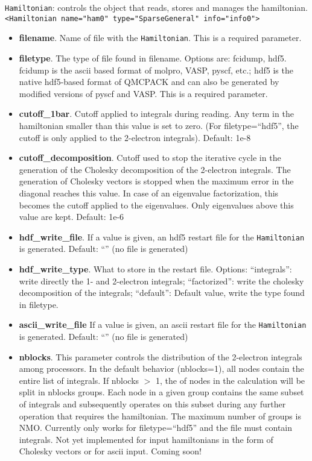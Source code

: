 \texttt{Hamiltonian}: controls the object that reads, stores and manages the hamiltonian. 
  \texttt{<Hamiltonian name="ham0" type="SparseGeneral" info="info0">}
\begin{itemize}
\item \textbf{filename}. Name of file with the \texttt{Hamiltonian}. This is a required parameter.
\item \textbf{filetype}. The type of file found in filename. Options are: fcidump, hdf5. fcidump is the ascii based format of molpro, VASP, pyscf, etc.; hdf5 is the native hdf5-based format  of QMCPACK and can also be generated by modified versions of pyscf and VASP. This is a required parameter.
\item \textbf{cutoff\_1bar}. Cutoff applied to integrals during reading. Any term in the hamiltonian smaller than this value is set to zero. (For filetype=``hdf5'', the cutoff is only applied to the 2-electron integrals). Default: 1e-8
\item \textbf{cutoff\_decomposition}. Cutoff used to stop the iterative cycle in the generation of the Cholesky decomposition of the 2-electron integrals. The generation of Cholesky vectors is stopped when the maximum error in the diagonal reaches this value. In case of an eigenvalue factorization, this becomes the cutoff applied to the eigenvalues. Only eigenvalues above this value are kept. Default: 1e-6
\item \textbf{hdf\_write\_file}. If a value is given, an hdf5 restart file for the \texttt{Hamiltonian} is generated. Default: ``'' (no file is generated)
\item \textbf{hdf\_write\_type}. What to store in the restart file. Options: ``integrals'': write directly the 1- and 2-electron integrals; ``factorized'': write the cholesky decomposition of the integrals; ``default'': Default value, write the type found in filetype.
\item \textbf{ascii\_write\_file} If a value is given, an ascii restart file for the \texttt{Hamiltonian} is generated. Default: ``'' (no file is generated)
\item \textbf{nblocks}. This parameter controls the distribution of the 2-electron integrals among processors. In the default behavior (nblocks=1), all nodes contain the entire list of integrals. If nblocks $>$ 1, the of nodes in the calculation will be split in nblocks groups. Each node in a given group contains the same subset of integrals and subsequently operates on this subset during  any further operation that requires the hamiltonian. The maximum number of groups is NMO. Currently only works for filetype=``hdf5'' and the file must contain integrals.  Not yet implemented for input hamiltonians in the form of Cholesky vectors or for ascii input. Coming soon!

\end{itemize}
